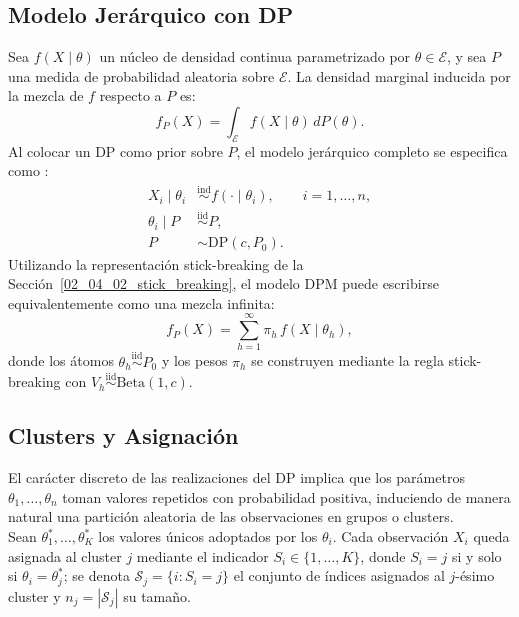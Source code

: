 \subsection{Modelo Jerárquico con DP}
\label{02_05_01_dpm}
Sea $f(X \mid \theta)$ un núcleo de densidad continua parametrizado por $\theta \in \mathcal{E}$, y sea $P$ una medida de probabilidad aleatoria sobre $\mathcal{E}$. La densidad marginal inducida por la mezcla de $f$ respecto a $P$ es:
\begin{equation}
    f_P(X) = \int_{\mathcal{E}} f(X \mid \theta)\, dP(\theta).
\end{equation}
Al colocar un DP como prior sobre $P$, el modelo jerárquico completo se especifica como \citep{02_04_muller2015bayesian}:
\begin{equation}
\begin{aligned}
    X_i \mid \theta_i &\overset{\mathrm{ind}}{\sim} f(\cdot \mid \theta_i),
    \qquad i = 1, \dots, n, \\
    \theta_i \mid P &\overset{\mathrm{iid}}{\sim} P, \\
    P &\sim \mathrm{DP}(c, P_0).
\end{aligned}
\end{equation}
Utilizando la representación stick-breaking de la Sección~\ref{02_04_02_stick_breaking}, el modelo DPM puede escribirse equivalentemente como una mezcla infinita:
\begin{equation}\label{eq:dpm_sb}
    f_P(X) = \sum_{h=1}^{\infty} \pi_h\, f(X \mid \theta_h),
\end{equation}
donde los átomos $\theta_h \overset{\mathrm{iid}}{\sim} P_0$ y los pesos $\pi_h$ se construyen mediante la regla stick-breaking con $V_h \overset{\mathrm{iid}}{\sim} \mathrm{Beta}(1, c)$.

\subsection{Clusters y Asignación}
\label{02_05_02_clusters}
El carácter discreto de las realizaciones del DP implica que los parámetros $\theta_1, \dots, \theta_n$ toman valores repetidos con probabilidad positiva, induciendo de manera natural una partición aleatoria de las observaciones en grupos o clusters.\\

Sean $\theta_1^*, \dots, \theta_K^*$ los valores únicos adoptados por los $\theta_i$. Cada observación $X_i$ queda asignada al cluster $j$ mediante el indicador $S_i \in \{1, \dots, K\}$, donde $S_i = j$ si y solo si $\theta_i = \theta_j^*$; se denota $\mathcal{S}_j = \{i : S_i = j\}$ el conjunto de índices asignados al $j$-ésimo cluster y $n_j = |\mathcal{S}_j|$ su tamaño.\\

